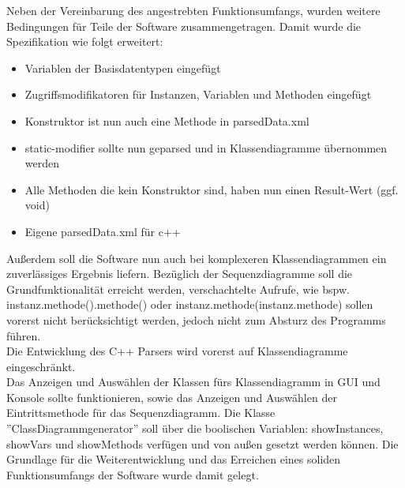 Neben der Vereinbarung des angestrebten Funktionsumfangs, wurden weitere Bedingungen für Teile der Software zusammengetragen. Damit wurde die Spezifikation wie folgt erweitert:\\
\begin {itemize}
\item Variablen der Basisdatentypen eingefügt
\item Zugriffsmodifikatoren für Instanzen, Variablen und Methoden eingefügt
\item Konstruktor ist nun auch eine Methode in parsedData.xml
\item static-modifier sollte nun geparsed und in Klassendiagramme übernommen werden
\item Alle Methoden die kein Konstruktor sind, haben nun einen Result-Wert (ggf. void)
\item Eigene parsedData.xml für c++
\end {itemize}
Außerdem soll die Software nun auch bei komplexeren Klassendiagrammen ein zuverlässiges Ergebnis liefern. Bezüglich der Sequenzdiagramme soll die Grundfunktionalität erreicht werden, verschachtelte Aufrufe, wie bspw. instanz.methode().methode() oder instanz.methode(instanz.methode) sollen vorerst nicht berücksichtigt werden, jedoch nicht zum Absturz des Programms führen.\\
Die Entwicklung des C++ Parsers wird vorerst auf Klassendiagramme eingeschränkt.\\
Das Anzeigen und Auswählen der Klassen fürs Klassendiagramm in GUI und Konsole sollte funktionieren, sowie das Anzeigen und Auswählen der Eintrittsmethode für das Sequenzdiagramm.
Die Klasse ''ClassDiagrammgenerator'' soll über die boolischen Variablen: showInstances, showVars und showMethods verfügen und von außen gesetzt werden können.
Die Grundlage für die Weiterentwicklung und das Erreichen eines soliden Funktionsumfangs der Software wurde damit gelegt.
\nsecend

